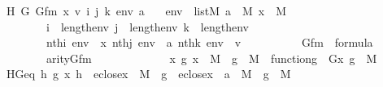 \begin{isabellebody}
\ \ \ H\ G\ Gfm\ x\ v\ i\ j\ k\ env\ a\isanewline
\ \ \ {\isachardoublequoteopen}env\ {\isasymin}\ list{\isacharparenleft}{\kern0pt}M{\isacharparenright}{\kern0pt}{\isachardoublequoteclose}\ {\isachardoublequoteopen}a\ {\isasymin}\ M{\isachardoublequoteclose}\ {\isachardoublequoteopen}x\ {\isasymin}\ M{\isachardoublequoteclose}\ \isanewline
\ \ \ \ \ \ \ \ \ \ {\isachardoublequoteopen}i\ {\isacharless}{\kern0pt}\ length{\isacharparenleft}{\kern0pt}env{\isacharparenright}{\kern0pt}{\isachardoublequoteclose}\ {\isachardoublequoteopen}j\ {\isacharless}{\kern0pt}\ length{\isacharparenleft}{\kern0pt}env{\isacharparenright}{\kern0pt}{\isachardoublequoteclose}\ {\isachardoublequoteopen}k\ {\isacharless}{\kern0pt}\ length{\isacharparenleft}{\kern0pt}env{\isacharparenright}{\kern0pt}{\isachardoublequoteclose}\ \isanewline
\ \ \ \ \ \ \ \ \ \ {\isachardoublequoteopen}nth{\isacharparenleft}{\kern0pt}i{\isacharcomma}{\kern0pt}\ env{\isacharparenright}{\kern0pt}\ {\isacharequal}{\kern0pt}\ x{\isachardoublequoteclose}\ {\isachardoublequoteopen}nth{\isacharparenleft}{\kern0pt}j{\isacharcomma}{\kern0pt}\ env{\isacharparenright}{\kern0pt}\ {\isacharequal}{\kern0pt}\ a{\isachardoublequoteclose}\ {\isachardoublequoteopen}nth{\isacharparenleft}{\kern0pt}k{\isacharcomma}{\kern0pt}\ env{\isacharparenright}{\kern0pt}\ {\isacharequal}{\kern0pt}\ v{\isachardoublequoteclose}\isanewline
\ \ \ \ \ \ \ \ \ \ {\isachardoublequoteopen}Gfm\ {\isasymin}\ formula{\isachardoublequoteclose}\ \isanewline
\ \ \ \ \ \ \ \ \ \ {\isachardoublequoteopen}arity{\isacharparenleft}{\kern0pt}Gfm{\isacharparenright}{\kern0pt}\ {\isasymle}\ {}{\isachardoublequoteclose}\ \isanewline
\ \ \ \ \ \ \ \ \ \ {\isachardoublequoteopen}{\isasymAnd}x\ g{\isachardot}{\kern0pt}\ x\ {\isasymin}\ M\ {\isasymLongrightarrow}\ g\ {\isasymin}\ M\ {\isasymLongrightarrow}\ function{\isacharparenleft}{\kern0pt}g{\isacharparenright}{\kern0pt}\ {\isasymLongrightarrow}\ G{\isacharparenleft}{\kern0pt}x{\isacharcomma}{\kern0pt}\ g{\isacharparenright}{\kern0pt}\ {\isasymin}\ M{\isachardoublequoteclose}\ \isanewline
\ \ \ HGeq{\isacharcolon}{\kern0pt}\ {\isachardoublequoteopen}{\isasymAnd}h\ g\ x{\isachardot}{\kern0pt}\ h\ {\isasymin}\ eclose{\isacharparenleft}{\kern0pt}x{\isacharparenright}{\kern0pt}\ {\isasymrightarrow}\ M\ {\isasymLongrightarrow}\ g\ {\isasymin}\ {\isacharparenleft}{\kern0pt}eclose{\isacharparenleft}{\kern0pt}x{\isacharparenright}{\kern0pt}\ {\isasymtimes}\ {\isacharbraceleft}{\kern0pt}a{\isacharbraceright}{\kern0pt}{\isacharparenright}{\kern0pt}\ {\isasymrightarrow}\ M\ {\isasymLongrightarrow}\ g\ {\isasymin}\ M\ \ \isanewline

\end{isabellebody}
